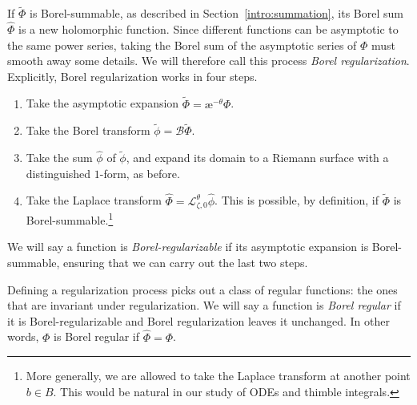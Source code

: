 \documentclass{article}
\newcommand{\series}[1]{\tilde{#1}}
\newcommand{\laplace}{\mathcal{L}}
\newcommand{\borel}{\mathcal{B}}
\newcommand{\aexp}{\text{\ae}}
\theoremstyle{definition}
\theoremstyle{plain}
\begin{document}
\begin{center}
\end{center}
If $\series{\Phi}$ is Borel-summable, as described in Section~\ref{intro:summation}, its Borel sum $\hat{\Phi}$ is a new holomorphic function.
Since different functions can be asymptotic to the same power series, taking the Borel sum of the asymptotic series of $\Phi$ must smooth away some details. We will therefore call this process {\em Borel regularization}. Explicitly, Borel regularization works in four steps.
\begin{enumerate}
\item Take the asymptotic expansion $\series{\Phi} = \aexp^{-\theta} \Phi$.
\item Take the Borel transform $\series{\phi} = \borel \series{\Phi}$.
\item Take the sum $\hat{\phi}$ of $\series{\phi}$, and expand its domain to a Riemann surface with a distinguished $1$-form, as before.%
\item Take the Laplace transform $\hat{\Phi} = \laplace_{\zeta, 0}^\theta \hat{\phi}$. This is possible, by definition, if $\series{\Phi}$ is Borel-summable.\footnote{More generally, we are allowed to take the Laplace transform at another point $b \in B$. This would be natural in our study of ODEs and thimble integrals.}
\end{enumerate}
We will say a function is {\em Borel-regularizable} if its asymptotic expansion is Borel-summable, ensuring that we can carry out the last two steps.

Defining a regularization process picks out a class of regular functions: the ones that are invariant under regularization. We will say a function is {\em Borel regular} if it is Borel-regularizable and Borel regularization leaves it unchanged. In other words, $\Phi$ is Borel regular if $\hat{\Phi} = \Phi$.
\end{document}
